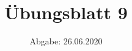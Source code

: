 

\subject{Computational Physics}
\title{Übungsblatt 9}
\date{%
  Abgabe: 26.06.2020
}



\maketitle
\thispagestyle{empty}
\newpage







